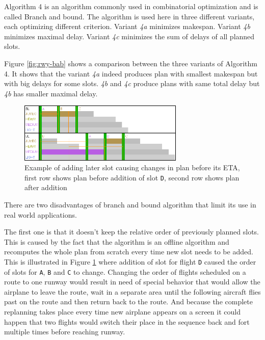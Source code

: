 Algorithm 4 is an algorithm commonly used in combinatorial optimization and is called Branch and bound. \cite{bab} The algorithm is used here in three different variants, each optimizing different criterion. Variant {\em 4a} minimizes makespan.  Variant {\em 4b} minimizes maximal delay. Variant {\em 4c} minimizes the sum of delays of all planned slots.

Figure \ref{fig:rwy-bab} shows a comparison between the three variants of Algorithm 4. It shows that the variant {\em 4a} indeed produces plan with smallest makespan but with big delays for some slots. {\em 4b} and {\em 4c} produce plans with same total delay but {\em 4b} has smaller maximal delay.

\begin{figure}[h]
    \centering
    \includegraphics[width=0.7\textwidth]{figures/rwy-proof.png}
    \caption{Example of adding later slot causing changes in plan before its ETA, first row shows plan before addition of slot \texttt{D}, second row shows plan after addition}
    \label{fig:rwy-proof}
\end{figure}

There are two disadvantages of branch and bound algorithm that limit its use in real world applications.

The first one is that it doesn't keep the relative order of previously planned slots. This is caused by the fact that the algorithm is an offline algorithm and recomputes the whole plan from scratch every time new slot needs to be added. This is illustrated in Figure \ref{fig:rwy-proof} where addition of slot for flight \texttt{D} caused the order of slots for \texttt{A}, \texttt{B} and \texttt{C} to change. Changing the order of flights scheduled on a route to one runway would result in need of special behavior that would allow the airplane to leave the route, wait in a separate area until the following aircraft flies past on the route and then return back to the route. And because the complete replanning takes place every time new airplane appears on a screen it could happen that two flights would switch their place in the sequence back and fort multiple times before reaching runway.

